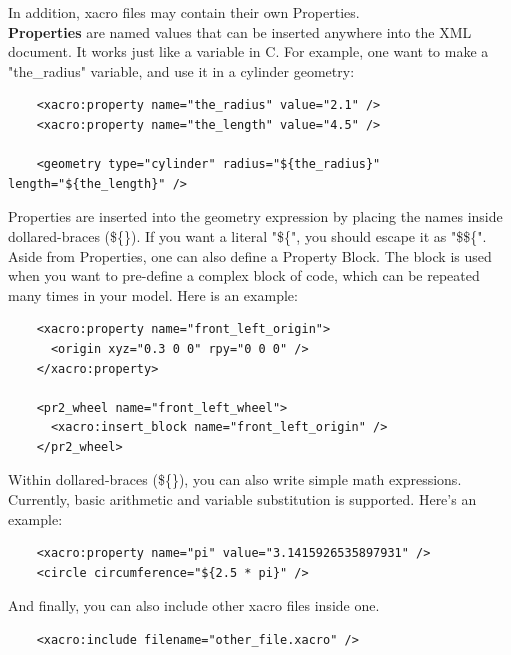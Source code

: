 \documentclass[pdftex,12pt,a4paper]{article}
\begin{document}
  \newpage
  In addition, xacro files may contain their own Properties.\\
  \textbf{Properties} are named values that can be inserted anywhere into the XML document. It works just like a variable in C. For example, one want to make a "the\_radius" variable, and use it in a cylinder geometry:
  \begin{lstlisting}
    <xacro:property name="the_radius" value="2.1" />
    <xacro:property name="the_length" value="4.5" />
    
    <geometry type="cylinder" radius="${the_radius}" length="${the_length}" />
  \end{lstlisting}
  Properties are inserted into the geometry expression by placing the names inside dollared-braces (\$\{\}). If you want a literal "\$\{", you should escape it as "\$\$\{".\\
  Aside from Properties, one can also define a Property Block. The block is used when you want to pre-define a complex block of code, which can be repeated many times in your model. Here is an example:
  \begin{lstlisting}
    <xacro:property name="front_left_origin">
      <origin xyz="0.3 0 0" rpy="0 0 0" />
    </xacro:property>
    
    <pr2_wheel name="front_left_wheel">
      <xacro:insert_block name="front_left_origin" />
    </pr2_wheel>
  \end{lstlisting}
  Within dollared-braces (\$\{\}), you can also write simple math expressions. Currently, basic arithmetic and variable substitution is supported. Here's an example: 
  \begin{lstlisting}
    <xacro:property name="pi" value="3.1415926535897931" />
    <circle circumference="${2.5 * pi}" />
  \end{lstlisting}
  And finally, you can also include other xacro files inside one.
  \begin{lstlisting}
    <xacro:include filename="other_file.xacro" />
  \end{lstlisting}
  
  \newpage
\end{document}
